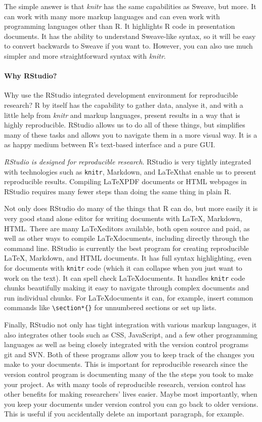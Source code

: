 \documentclass[ChapterTOCs,krantz1]{krantz}\usepackage{graphicx, color}
\begin{document}
The simple answer is that {\emph{knitr}} has the same capabilities as Sweave, but more. It can work with many more markup languages and can even work with programming languages other than R. It highlights R code in presentation documents. It has the ability to understand Sweave-like syntax, so it will be easy to convert backwards to Sweave if you want to. However, you can also use much simpler and more straightforward syntax with {\emph{knitr}}. 

\paragraph{Why RStudio?}
Why use the RStudio integrated development environment for reproducible research? R by itself has the capability to gather data, analyse it, and with a little help from {\emph{knitr}} and markup languages, present results in a way that is highly reproducible. RStudio allows us to do all of these things, but simplifies many of these tasks and allows you to navigate them in a more visual way. It is a as happy medium between R's text-based interface and a pure GUI. 

{\emph{RStudio is designed for reproducible research}}. RStudio is very tightly integrated with technologies such as {\tt{knitr}}, Markdown, and \LaTeX that enable us to present reproducible results. Compiling \LaTeX PDF documents or HTML webpages in RStudio requires many fewer steps than doing the same thing in plain R. 

Not only does RStudio do many of the things that R can do, but more easily it is very good stand alone editor for writing documents with \LaTeX, Markdown, HTML. There are many \LaTeX editors available, both open source and paid, as well as other ways to compile \LaTeX documents, including directly through the command line. RStudio is currently the best program for creating reproducible \LaTeX, Markdown, and HTML documents. It has full syntax highlighting, even for documents with \texttt{knitr} code (which it can collapse when you just
want to work on the text). It can spell check \LaTeX documents. It handles \texttt{knitr} code chunks beautifully making it easy to navigate through complex documents and run individual chunks. For \LaTeX documents it can, for example, insert common commands like \texttt{\textbackslash{}section*\{\}} for unnumbered sections or set up lists. 

Finally, RStudio not only has tight integration with various markup languages, it also integrates other tools such as CSS, JavaScript, and a few other programming languages as well as being closely integrated with the version control programs git and SVN. Both of these programs allow you to keep track of the changes you make to your documents. This is important for reproducible research since the version control program is documenting many of the the steps you took to make your project. As with many tools of reproducible research, version control has other benefits for making researchers' lives easier. Maybe most importantly, when you keep your documents under version control you can go back to older versions. This is useful if you accidentally delete an important paragraph, for example.
\end{document}

